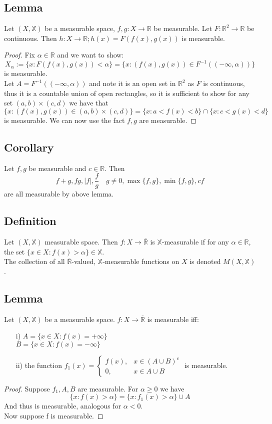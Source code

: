 \documentclass[a4paper, 12pt, twoside]{article}
\begin{document}
\subsection{Lemma}
Let $(X,\mathbb{X})$ be a measurable space, $f,g:X\to \mathbb{R}$ be measurable. Let $F:\mathbb{R}^{2}\to \mathbb{R}$ be continuous. Then $h:X\to \mathbb{R}; h(x)=F(f(x),g(x))$ is measurable.
\begin{proof}
    Fix $\alpha \in \mathbb{R}$ and we want to show:
    $$X_{\alpha}:=\{x:F(f(x),g(x))<\alpha\}=\{x:(f(x),g(x))\in F^{-1}((-\infty,\alpha)) \}$$
    is measurable.\\
    Let $A=F^{-1}((-\infty,\alpha))$ and note it is an open set in $\mathbb{R}^{2}$ as $F$ is continuous, thus it is a countable union of open rectangles, so it is sufficient to show for any set $(a,b)\times(c,d)$ we have that
    $$\{x:(f(x),g(x))\in(a,b)\times(c,d)\}=\{x:a<f(x)<b\}\cap\{x:c<g(x)<d\} $$
    is measurable. We can now use the fact $f,g$ are measurable.
\end{proof}
\subsection{Corollary}
Let $f,g$ be measurable and $c\in \mathbb{R}$. Then
$$f+g,fg,|f|,\frac{f}{g}\quad g\neq0,\max\{f,g\},\min\{f,g\},cf$$
are all measurable by above lemma.
\subsection{Definition}
Let $(X,\mathbb{X})$ measurable space. Then $f:X \to  \overline{\mathbb{R}}$ is $\mathbb{X}$-measurable if for any $\alpha\in \mathbb{R}$, the set $\{x\in X:f(x)>\alpha\}\in \mathbb{X}$.\\
The collection of all $\overline{\mathbb{R}}$-valued, $\mathbb{X}$-measurable functions on $X$ is denoted $M(X,\mathbb{X})$.
\subsection{Lemma}
Let $(X,\mathbb{X})$ be a measurable space. $f:X\to \overline{\mathbb{R}}$ is measurable iff:
\begin{itemize}
    \item[i)] $A=\{x\in X:f(x)=+\infty\}$\\
    $B=\{x\in X:f(x)=-\infty\}$
    \item[ii)] the function $f_{1}(x)=
    \begin{cases}
      f(x), & x\in(A\cup B)^{c} \\
      0, & x\in A\cup B
   \end{cases}$ is measurable.
\end{itemize}
\begin{proof}
    Suppose $f_{1},A,B$ are measurable. For $\alpha\geq0$ we have
    $$\{x:f(x)>\alpha\}=\{x:f_{1}(x)>\alpha\}\cup A $$
    And thus is measurable, analogous for $\alpha<0$.\\
    Now suppose f is measurable.
\end{proof}
\end{document}
